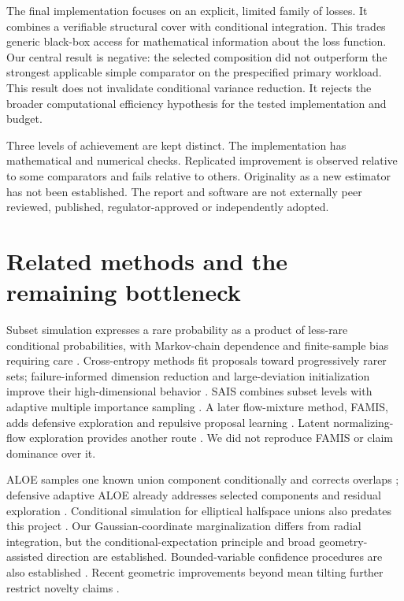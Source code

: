 \documentclass[11pt]{article}
\begin{document}
The final implementation focuses on an explicit, limited family of losses. It combines a verifiable structural cover with conditional integration. This trades generic black-box access for mathematical information about the loss function. Our central result is negative: the selected composition did not outperform the strongest applicable simple comparator on the prespecified primary workload. This result does not invalidate conditional variance reduction. It rejects the broader computational efficiency hypothesis for the tested implementation and budget.

Three levels of achievement are kept distinct. The implementation has mathematical and numerical checks. Replicated improvement is observed relative to some comparators and fails relative to others. Originality as a new estimator has not been established. The report and software are not externally peer reviewed, published, regulator-approved or independently adopted.

\section{Related methods and the remaining bottleneck}
Subset simulation expresses a rare probability as a product of less-rare conditional probabilities, with Markov-chain dependence and finite-sample bias requiring care \citep{au2001,openturns}. Cross-entropy methods fit proposals toward progressively rarer sets; failure-informed dimension reduction and large-deviation initialization improve their high-dimensional behavior \citep{uribe2021,tong2023}. SAIS combines subset levels with adaptive multiple importance sampling \citep{helal2025}. A later flow-mixture method, FAMIS, adds defensive exploration and repulsive proposal learning \citep{famis2026}. Latent normalizing-flow exploration provides another route \citep{kruse2025}. We did not reproduce FAMIS or claim dominance over it.

ALOE samples one known union component conditionally and corrects overlaps \citep{owen2019aloe}; defensive adaptive ALOE already addresses selected components and residual exploration \citep{elvira2021}. Conditional simulation for elliptical halfspace unions also predates this project \citep{ahn2018}. Our Gaussian-coordinate marginalization differs from radial integration, but the conditional-expectation principle and broad geometry-assisted direction are established. Bounded-variable confidence procedures are also established \citep{maurer2009,dietrich2026,jain2025}. Recent geometric improvements beyond mean tilting further restrict novelty claims \citep{li2026}.
\end{document}
